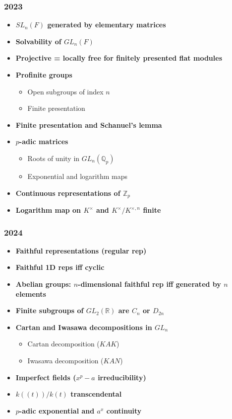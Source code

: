 \subsubsection*{2023}
\begin{itemize}
    \item \textbf{$SL_n(F)$ generated by elementary matrices}
    \item \textbf{Solvability of $GL_n(F)$}
    \item \textbf{Projective = locally free for finitely presented flat modules}
    \item \textbf{Profinite groups}
        \begin{itemize}
            \item Open subgroups of index $n$
            \item Finite presentation
        \end{itemize}
    \item \textbf{Finite presentation and Schanuel's lemma}
    \item \textbf{$p$-adic matrices}
        \begin{itemize}
            \item Roots of unity in $GL_n(\mathbb{Q}_p)$
            \item Exponential and logarithm maps
        \end{itemize}
    \item \textbf{Continuous representations of $\mathbb{Z}_p$}
    \item \textbf{Logarithm map on $K^\times$ and $K^\times/K^{\times,n}$ finite}
\end{itemize}

\subsubsection*{2024}
\begin{itemize}
    \item \textbf{Faithful representations (regular rep)}
    \item \textbf{Faithful 1D reps iff cyclic}
    \item \textbf{Abelian groups: $n$-dimensional faithful rep iff generated by $n$ elements}
    \item \textbf{Finite subgroups of $GL_2(\mathbb{R})$ are $C_n$ or $D_{2n}$}
    \item \textbf{Cartan and Iwasawa decompositions in $GL_n$}
        \begin{itemize}
            \item Cartan decomposition ($KAK$)
            \item Iwasawa decomposition ($KAN$)
        \end{itemize}
    \item \textbf{Imperfect fields ($x^p - a$ irreducibility)}
    \item \textbf{$k((t))/k(t)$ transcendental}
    \item \textbf{$p$-adic exponential and $a^x$ continuity}
\end{itemize}

